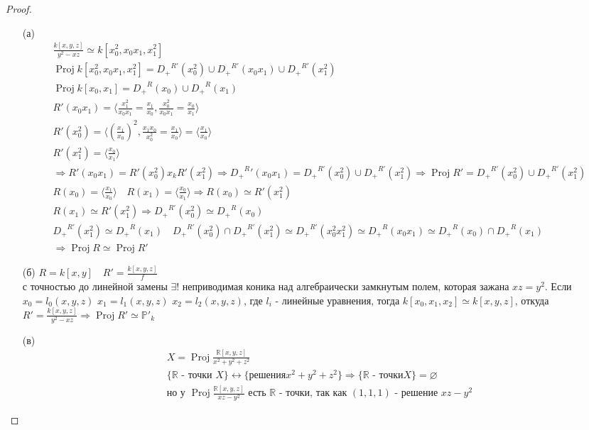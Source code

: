 \begin{proof}
\begin{itemize}
\item[(а)]
	\begin{gather*}
		\frac{k[x,y,z]}{y^2-xz} \simeq k[x_0^2, x_0 x_1, x_1^2]\\
		\operatorname{Proj} k[x_0^2, x_0 x_1, x_1^2] = {D_+}^{R'}(x_0^2) \cup {D_+}^{R'}(x_0 x_1) \cup {D_+}^{R'}(x_1^2)\\
		\operatorname{Proj} k[x_0, x_1] = {D_+}^{R}(x_0) \cup {D_+}^{R}(x_1)\\
		R'(x_0 x_1) = \langle \frac{x_1^2}{x_0 x_1} = \frac{x_1}{x_0}, \frac{x_0^2}{x_0 x_1} = \frac{x_0}{x_1} \rangle\\
		R'(x_0^2) = \langle \left(\frac{x_1}{x_0}\right)^2, \frac{x_1 x_0}{x_0^2} = \frac{x_1}{x_0} \rangle = \langle \frac{x_1}{x_0} \rangle\\
		R'(x_1^2) = \langle \frac{x_0}{x_1} \rangle\\
		\Rightarrow R'(x_0 x_1) = R'(x_0^2) x_k R'(x_1^2)
		\Rightarrow {D_+}^{R}'(x_0 x_1) = {D_+}^{R'}(x_0^2) \cup {D_+}^{R'}(x_1^2)
		\Rightarrow \operatorname{Proj} R' = {D_+}^{R'} (x_0^2) \cup {D_+}^{R'}(x_1^2)\\
		R(x_0) = \langle \frac{x_1}{x_0} \rangle\quad
		R(x_1) = \langle \frac{x_0}{x_1} \rangle
		\Rightarrow R(x_0) \simeq R'(x_1^2)\\
		R(x_1) \simeq R'(x_1^2)
		\Rightarrow {D_+}^{R'}(x_0^2) \simeq {D_+}^{R}(x_0)\\
		{D_+}^{R'}(x_1^2) \simeq {D_+}^{R}(x_1)\quad
		{D_+}^{R'}(x_0^2) \cap {D_+}^{R'}(x_1^2) \simeq
		{D_+}^{R'}(x_0^2 x_1^2) \simeq {D_+}^{R}(x_0 x_1) \simeq {D_+}^{R}(x_0) \cap {D_+}^{R}(x_1)\\
		\Rightarrow \operatorname{Proj} R \simeq \operatorname{Proj} R'
	\end{gather*}
\item[(б)]
	$R = k[x,y]\quad R'= \frac{k[x,y,z]}{f}$\\
	с точностью до линейной замены $\exists !$ неприводимая коника над алгебраически замкнутым полем, которая зажана $xz = y^2$. Если $x_0 = l_0(x,y,z)$ $x_1 = l_1(x,y,z)$ $x_2 = l_2(x,y,z)$, где $l_i$ - линейные уравнения, тогда $k[x_0, x_1, x_2] \simeq k[x,y,z]$, откуда $R' = \frac{k[x,y,z]}{y^2-xz} \Rightarrow \operatorname{Proj} R'\simeq \mathbb{P}'_{k}$
\item[(в)]
	\begin{gather*}
		X = \operatorname{Proj} \frac{\mathbb{R}[x,y,z]}{x^2+y^2+z^2}\\
		\{\mathbb{R} \text{ - точки } X\} \leftrightarrow \{\text{решения} x^2+y^2+z^2\}
		\Rightarrow \{\mathbb{R} \text{ - точки} X\} = \varnothing\\
		\text{но у } \operatorname{Proj} \frac{\mathbb{R}[x,y,z]}{xz-y^2}
		\text{ есть } \mathbb{R} \text{ - точки, так как } (1,1,1) \text{ - решение } xz-y^2
	\end{gather*}
\end{itemize}
\end{proof}
\vskip 0.6in







